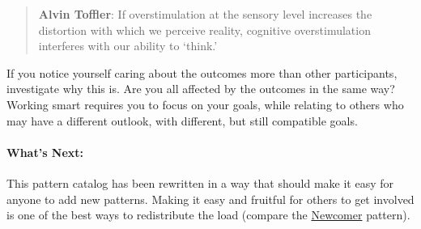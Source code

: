 \begin{quote}
\textbf{Alvin Toffler}: If overstimulation at the sensory level
increases the distortion with which we perceive reality, cognitive
overstimulation interferes with our ability to `think.'
\end{quote}

If you notice yourself caring about the outcomes more than other
participants, investigate why this is. Are you all affected by the
outcomes in the same way? Working smart requires you to focus on your
goals, while relating to others who may have a different outlook, with
different, but still compatible goals.

\paragraph{What's Next:} This pattern catalog has been rewritten in a way
that should make it easy for anyone to add new patterns. Making it easy
and fruitful for others to get involved is one of the best ways to
redistribute the load (compare
the \href{http://peeragogy.org/practice/heuristics/newcomer/}{Newcomer}
pattern).
